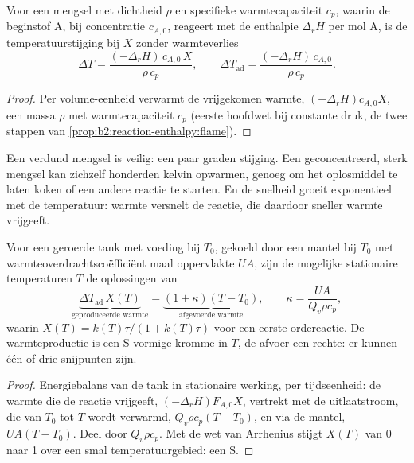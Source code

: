 \begin{proposition}\label{prop:b2:continuous-reactors:adiabatic}
Voor een mengsel met dichtheid $\rho$ en specifieke warmtecapaciteit $c_p$, waarin
de beginstof A, bij concentratie $c_{A,0}$, reageert met de enthalpie
$\Delta_r H$ per mol A, is de temperatuurstijging bij  $X$ zonder
warmteverlies
\[
  \Delta T = \frac{(-\Delta_r H)\,c_{A,0}\,X}{\rho\,c_p}, \qquad
  \Delta T_{\text{ad}} = \frac{(-\Delta_r H)\,c_{A,0}}{\rho\,c_p} .
\]
\end{proposition}

\begin{proof}
Per volume-eenheid verwarmt de vrijgekomen warmte, $(-\Delta_r H)c_{A,0}X$, een
massa $\rho$ met warmtecapaciteit $c_p$ (eerste hoofdwet bij constante druk, de twee
stappen van \cref{prop:b2:reaction-enthalpy:flame}).
\end{proof}

Een verdund mengsel is veilig: een paar graden stijging. Een geconcentreerd, sterk
 mengsel kan zichzelf honderden kelvin opwarmen, genoeg om het
oplosmiddel te laten koken of een andere reactie te starten. En de snelheid groeit exponentieel met de
temperatuur: warmte versnelt de reactie, die daardoor sneller warmte vrijgeeft.

\begin{proposition}\label{prop:b2:continuous-reactors:steady-states}
Voor een geroerde tank met voeding bij $T_0$, gekoeld door een mantel bij $T_0$ met
warmteoverdrachtscoëfficiënt maal oppervlakte $UA$, zijn de mogelijke stationaire temperaturen
$T$ de oplossingen van
\[
  \underbrace{\Delta T_{\text{ad}}\,X(T)}_{\text{geproduceerde warmte}} =
  \underbrace{(1 + \kappa)(T - T_0)}_{\text{afgevoerde warmte}}, \qquad
  \kappa = \frac{UA}{Q_v\rho c_p},
\]
waarin $X(T) = k(T)\tau/(1 + k(T)\tau)$ voor een eerste-ordereactie. De warmteproductie is
een S-vormige kromme in $T$, de afvoer een rechte: er kunnen één of drie
snijpunten zijn.
\end{proposition}

\begin{proof}
Energiebalans van de tank in stationaire werking, per tijdseenheid: de warmte die
de reactie vrijgeeft, $(-\Delta_r H)F_{A,0}X$, vertrekt met de
uitlaatstroom, die van $T_0$ tot $T$ wordt verwarmd, $Q_v\rho c_p(T - T_0)$, en via
de mantel, $UA(T - T_0)$. Deel door $Q_v\rho c_p$. Met de wet van Arrhenius
stijgt $X(T)$ van 0 naar 1 over een smal temperatuurgebied: een S.
\end{proof}

